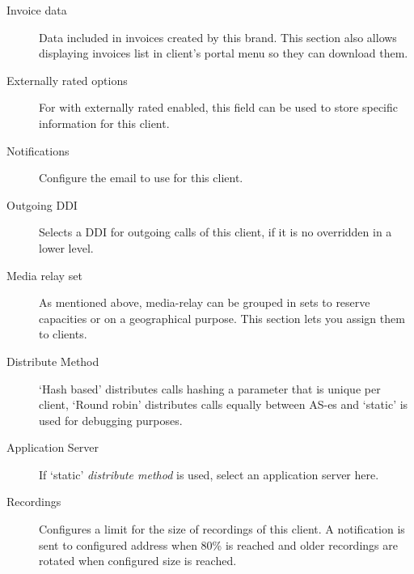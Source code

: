 \documentclass[letterpaper,10pt,english]{sphinxmanual}
\begin{document}
\begin{description}
\item[{Invoice data}] \leavevmode{}\label{administration_portal/brand/clients/virtual_pbx:term-invoice-data}
Data included in invoices created by this brand. This section also allows displaying invoices list in
client's portal menu so they can download them.

\item[{Externally rated options}] \leavevmode{}\label{administration_portal/brand/clients/virtual_pbx:term-externally-rated-options}
For {\hyperref[administration_portal/brand/providers/carriers:carriers]{}} with externally rated enabled, this field can be used to store specific
information for this client.

\item[{Notifications}] \leavevmode{}\label{administration_portal/brand/clients/virtual_pbx:term-notifications}
Configure the email {\hyperref[administration_portal/brand/settings/notification_templates:notification\string-templates]{}} to use for this client.

\item[{Outgoing DDI}] \leavevmode{}\label{administration_portal/brand/clients/virtual_pbx:term-outgoing-ddi}
Selects a DDI for outgoing calls of this client, if it is no overridden in
a lower level.

\item[{Media relay set}] \leavevmode{}\label{administration_portal/brand/clients/virtual_pbx:term-media-relay-set}
As mentioned above, media-relay can be grouped in sets to reserve capacities
or on a geographical purpose. This section lets you assign them to clients.

\item[{Distribute Method}] \leavevmode{}\label{administration_portal/brand/clients/virtual_pbx:term-distribute-method}
`Hash based' distributes calls hashing a parameter that is unique per
client, `Round robin' distributes calls equally between AS-es and
`static' is used for debugging purposes.

\item[{Application Server}] \leavevmode{}\label{administration_portal/brand/clients/virtual_pbx:term-application-server}
If `static' \emph{distribute method} is used, select an application server here.

\item[{Recordings}] \leavevmode{}\label{administration_portal/brand/clients/virtual_pbx:term-recordings}
Configures a limit for the size of recordings of this client. A
notification is sent to configured address when 80\% is reached and
older recordings are rotated when configured size is reached.

\end{description}
\end{document}

